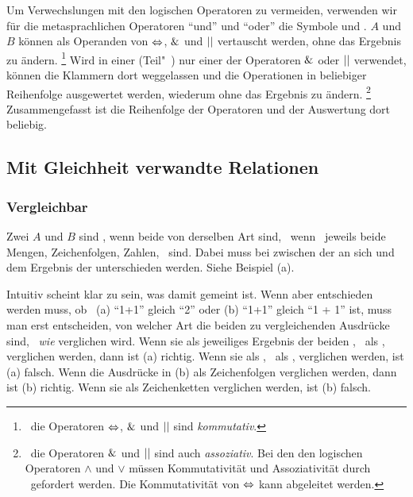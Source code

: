 Um Verwechslungen mit den logischen Operatoren zu vermeiden, verwenden wir für die metasprachlichen Operatoren \enquote{und} und \enquote{oder} die Symbole \chrqt{$\metaandsym$} und \chrqt{$\metaorsym$}.
$A$ und $B$ können als Operanden von $\Leftrightarrow$, $\metaandsym$ und $\metaorsym$ vertauscht werden, ohne das Ergebnis zu ändern.%
\footnote{%
	\textDh\ die Operatoren $\Leftrightarrow$, $\metaandsym$ und $\metaorsym$ sind \emph{kommutativ}.
}
Wird in einer (Teil"~) nur einer der Operatoren $\metaandsym$ oder $\metaorsym$ verwendet, können die Klammern dort weggelassen und die Operationen in beliebiger Reihenfolge ausgewertet werden, wiederum ohne das Ergebnis zu ändern.%
\footnote{%
	\textDh\ die Operatoren $\metaandsym$ und $\metaorsym$ sind auch \emph{assoziativ}.
	Bei den den logischen Operatoren $\land$ und $\lor$ müssen Kommutativität und Assoziativität durch \Axiome\ gefordert werden.
	Die Kommutativität von $\Leftrightarrow$ kann abgeleitet werden.
}
Zusammengefasst ist die Reihenfolge der Operatoren und der Auswertung dort beliebig.

\subsection{Mit Gleichheit verwandte Relationen}%
\label{sub:Gleichheit}

\subsubsection{Vergleichbar}%
\label{subsub:Vergleichbar}

Zwei  $A$ und $B$ sind , wenn beide von derselben Art sind, \textdh\ wenn \textzB\ jeweils beide Mengen, Zeichenfolgen, Zahlen, \textusw\ sind.
Dabei muss bei  zwischen der  an sich und dem Ergebnis der  unterschieden werden. Siehe Beispiel (a).

Intuitiv scheint klar zu sein, was damit  gemeint ist.
Wenn aber entschieden werden muss, ob \textzB\ (a) \enquote{1+1} gleich \enquote{2} oder (b) \enquote{1+1} gleich \enquote{1 + 1} ist, muss man erst entscheiden, von welcher Art die beiden zu vergleichenden Ausdrücke sind, \textdh\ \emph{wie} verglichen wird.
Wenn sie als jeweiliges Ergebnis der beiden , \textdh\ als , verglichen werden, dann ist (a) richtig.
Wenn sie als , \textdh\ als , verglichen werden, ist (a) falsch.
Wenn die Ausdrücke in (b) als Zeichenfolgen verglichen werden, dann ist (b) richtig.
Wenn sie als Zeichenketten verglichen werden, ist (b) falsch.

